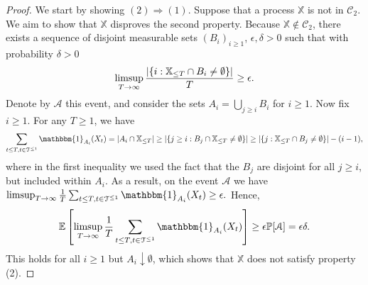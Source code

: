 \documentclass[aos]{imsart}
\theoremstyle{plain}
\theoremstyle{remark}
\newcommand{\Acal}{\mathcal{A}}
\newcommand{\Ccal}{\mathcal{C}}
\newcommand{\Tcal}{\mathcal{T}}
\newcommand{\Ebb}{\mathbb{E}}
\newcommand{\Pbb}{\mathbb{P}}
\newcommand{\Xbb}{\mathbb{X}}
\newcommand{\1}{\mathbbm{1}}%
\renewcommand{\limsup}{\mathop{\rm limsup}}
\begin{document}
\begin{proof}
We start by showing $(2)\Rightarrow (1)$. Suppose that a process $\Xbb$ is not in $\Ccal_2$. We aim to show that $\Xbb$ disproves the second property. Because $\Xbb\notin\Ccal_2$, there exists a sequence of disjoint measurable sets $(B_i)_{i\geq 1}$, $\epsilon, \delta>0$ such that with probability $\delta>0$
\begin{equation*}
    \limsup_{T\to\infty} \frac{|\{i: \Xbb_{\leq T}\cap B_i\neq\emptyset\}|}{T} \geq \epsilon.
\end{equation*}
Denote by $\Acal$ this event, and consider the sets $A_i = \bigcup_{j\geq i} B_i$ for $i\geq 1$. Now fix $i\geq 1$. For any $T\geq 1$, we have
\begin{equation*}
    \sum_{t\leq T,t\in\Tcal^{\leq 1}}\1_{A_i}(X_t)=|A_i\cap\Xbb_{\leq T}|\geq |\{j\geq i: B_j\cap\Xbb_{\leq T}\neq \emptyset\}|\geq |\{j: \Xbb_{\leq T}\cap B_j\neq\emptyset\}| - (i-1),
\end{equation*}
where in the first inequality we used the fact that the $B_j$ are disjoint for all $j\geq i$, but included within $A_i$. As a result, on the event $\Acal$ we have $\limsup_{T\to\infty} \frac{1}{T}\sum_{t\leq T,t\in\Tcal^{\leq 1}}\1_{A_i}(X_t) \geq \epsilon.$ Hence, 
\begin{equation*}
    \Ebb \left[\limsup_{T\to\infty} \frac{1}{T}\sum_{t\leq T,t\in\Tcal^{\leq 1}}\1_{A_i}(X_t) \right] \geq \epsilon \Pbb[\Acal] = \epsilon\delta.
\end{equation*}
This holds for all $i\geq 1$ but $A_i\downarrow\emptyset$, which shows that $\Xbb$ does not satisfy property (2).


\end{proof}
\end{document}
